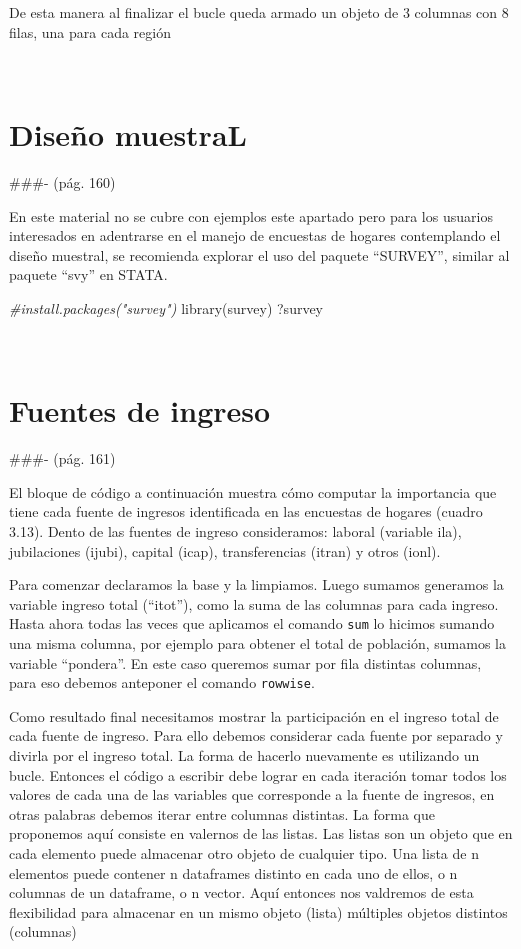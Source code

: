 \documentclass[
]{book}
\newenvironment{Shaded}{\begin{snugshade}}{\end{snugshade}}
\newcommand{\CommentTok}[1]{\textcolor[rgb]{0.56,0.35,0.01}{\textit{#1}}}
\newcommand{\FunctionTok}[1]{\textcolor[rgb]{0.00,0.00,0.00}{#1}}
\newcommand{\NormalTok}[1]{#1}
\begin{document}
De esta manera al finalizar el bucle queda armado un objeto de 3 columnas con 8 filas, una para cada región

~

\hypertarget{diseuxf1o-muestral}{%
\section{Diseño muestraL}\label{diseuxf1o-muestral}}

\#\#\#- (pág. 160)

En este material no se cubre con ejemplos este apartado pero para los usuarios interesados en adentrarse en el manejo de encuestas de hogares contemplando el diseño muestral, se recomienda explorar el uso del paquete ``SURVEY'', similar al paquete ``svy'' en STATA.

\begin{Shaded}
\begin{Highlighting}[]
\CommentTok{\#install.packages("survey")}
\FunctionTok{library}\NormalTok{(survey)}
\NormalTok{?survey}
\end{Highlighting}
\end{Shaded}

~

\hypertarget{fuentes-de-ingreso}{%
\section{Fuentes de ingreso}\label{fuentes-de-ingreso}}

\#\#\#- (pág. 161)

El bloque de código a continuación muestra cómo computar la importancia que tiene cada fuente de ingresos identificada en las encuestas de hogares (cuadro 3.13). Dento de las fuentes de ingreso consideramos: laboral (variable ila), jubilaciones (ijubi), capital (icap), transferencias (itran) y otros (ionl).

Para comenzar declaramos la base y la limpiamos. Luego sumamos generamos la variable ingreso total (``itot''), como la suma de las columnas para cada ingreso. Hasta ahora todas las veces que aplicamos el comando \texttt{sum} lo hicimos sumando una misma columna, por ejemplo para obtener el total de población, sumamos la variable ``pondera''. En este caso queremos sumar por fila distintas columnas, para eso debemos anteponer el comando \texttt{rowwise}.

Como resultado final necesitamos mostrar la participación en el ingreso total de cada fuente de ingreso. Para ello debemos considerar cada fuente por separado y divirla por el ingreso total. La forma de hacerlo nuevamente es utilizando un bucle. Entonces el código a escribir debe lograr en cada iteración tomar todos los valores de cada una de las variables que corresponde a la fuente de ingresos, en otras palabras debemos iterar entre columnas distintas. La forma que proponemos aquí consiste en valernos de las listas. Las listas son un objeto que en cada elemento puede almacenar otro objeto de cualquier tipo. Una lista de n elementos puede contener n dataframes distinto en cada uno de ellos, o n columnas de un dataframe, o n vector. Aquí entonces nos valdremos de esta flexibilidad para almacenar en un mismo objeto (lista) múltiples objetos distintos (columnas)
\end{document}
